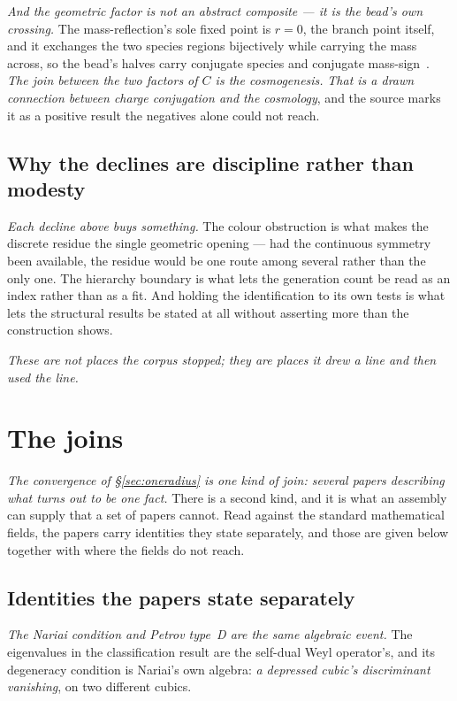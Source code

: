 \documentclass[11pt,a4paper]{article}
\theoremstyle{plain}
\theoremstyle{definition}
\begin{document}
\emph{And the geometric factor is not an abstract composite --- it is the bead's own crossing.} The
mass-reflection's sole fixed point is $r=0$, the branch point itself, and it exchanges the two species
regions bijectively while carrying the mass across, so the bead's halves carry conjugate species and
conjugate mass-sign~\cite{JanzenBoundary}. \emph{The join between the two factors of $C$ is the
cosmogenesis.} \emph{That is a drawn connection between charge conjugation and the cosmology}, and the source
marks it as a positive result the negatives alone could not reach.

\subsection{Why the declines are discipline rather than modesty}

\emph{Each decline above buys something.} The colour obstruction is what makes the discrete residue the
single geometric opening --- had the continuous symmetry been available, the residue would be one route among
several rather than the only one. The hierarchy boundary is what lets the generation count be read as an
index rather than as a fit. And holding the identification to its own tests is what lets the
structural results be stated at all without asserting more than the construction shows.

\emph{These are not places the corpus stopped; they are places it drew a line and then used the line.}




\section{The joins}\label{sec:joins}

\emph{The convergence of \S\ref{sec:oneradius} is one kind of join: several papers describing what turns out
to be one fact.} There is a second kind, and it is what an assembly can supply that a set of papers cannot.
Read against the standard mathematical fields, the papers carry identities they state separately, and
those are given below together with where the fields do not reach.

\subsection{Identities the papers state separately}

\emph{The Nariai condition and Petrov type~D are the same algebraic event.} The eigenvalues in the
classification result are the self-dual Weyl operator's, and its degeneracy condition is Nariai's own
algebra: \emph{a depressed cubic's discriminant vanishing}, on two different cubics.
\end{document}
